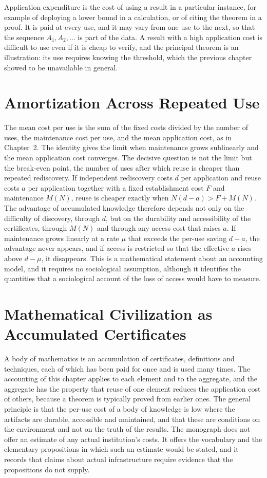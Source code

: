 \documentclass[11pt,letterpaper]{report}
\theoremstyle{plain}
\theoremstyle{definition}
\theoremstyle{remark}
\begin{document}
Application expenditure is the cost of using a result in a particular instance, for example of deploying a lower bound in a calculation, or of citing the theorem in a proof. It is paid at every use, and it may vary from one use to the next, so that the sequence $A_1,A_2,\ldots$ is part of the data. A result with a high application cost is difficult to use even if it is cheap to verify, and the principal theorem is an illustration: its use requires knowing the threshold, which the previous chapter showed to be unavailable in general.

\section{Amortization Across Repeated Use}

The mean cost per use is the sum of the fixed costs divided by the number of uses, the maintenance cost per use, and the mean application cost, as in Chapter~2. The identity gives the limit when maintenance grows sublinearly and the mean application cost converges. The decisive question is not the limit but the break-even point, the number of uses after which reuse is cheaper than repeated rediscovery. If independent rediscovery costs $d$ per application and reuse costs $a$ per application together with a fixed establishment cost $F$ and maintenance $M(N)$, reuse is cheaper exactly when $N(d-a)>F+M(N)$. The advantage of accumulated knowledge therefore depends not only on the difficulty of discovery, through $d$, but on the durability and accessibility of the certificates, through $M(N)$ and through any access cost that raises $a$. If maintenance grows linearly at a rate $\mu$ that exceeds the per-use saving $d-a$, the advantage never appears, and if access is restricted so that the effective $a$ rises above $d-\mu$, it disappears. This is a mathematical statement about an accounting model, and it requires no sociological assumption, although it identifies the quantities that a sociological account of the loss of access would have to measure.

\section{Mathematical Civilization as Accumulated Certificates}

A body of mathematics is an accumulation of certificates, definitions and techniques, each of which has been paid for once and is used many times. The accounting of this chapter applies to each element and to the aggregate, and the aggregate has the property that reuse of one element reduces the application cost of others, because a theorem is typically proved from earlier ones. The general principle is that the per-use cost of a body of knowledge is low where the artifacts are durable, accessible and maintained, and that these are conditions on the environment and not on the truth of the results. The monograph does not offer an estimate of any actual institution's costs. It offers the vocabulary and the elementary propositions in which such an estimate would be stated, and it records that claims about actual infrastructure require evidence that the propositions do not supply.
\end{document}

